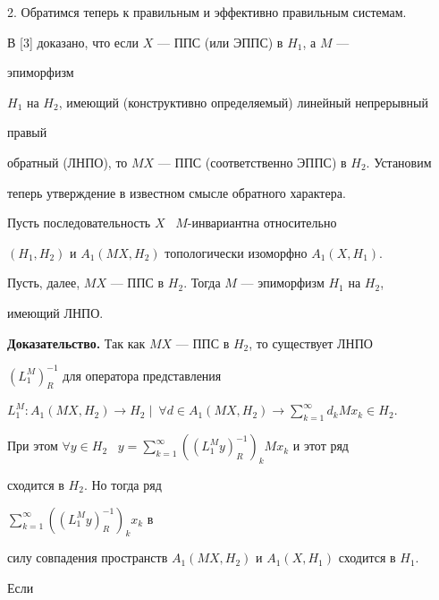 \medskip








2. Обратимся теперь к правильным и эффективно правильным системам.


В [3] доказано, что если $X$ --- ППС (или ЭППС) в $H_1$, а $M$ ---


эпиморфизм


$H_1$ на $H_2$, имеющий (конструктивно определяемый) линейный непрерывный


правый


обратный (ЛНПО), то $MX$ --- ППС (соответственно ЭППС) в $H_2$. Установим


теперь утверждение в известном смысле обратного характера.








\begin{prop}


Пусть последовательность $X$ \ $M$-инвариантна относительно


$(H_1,H_2)$ и $A_1(MX,H_2)$ топологически изоморфно $A_1(X,H_1)$.


Пусть, далее, $MX$ --- ППС в $H_2$. Тогда $M$ --- эпиморфизм $H_1$ на $H_2$,


имеющий ЛНПО.


\end{prop}








{\bf Доказательство.} Так как $MX$ --- ППС в $H_2$, то существует ЛНПО


$(L_1^M)_R^{-1}$ для оператора представления


$L_1^M:A_1(MX,H_2)\to H_2 \mid \ \forall d\in


A_1(MX,H_2)\longrightarrow


\sum\limits_{k=1}^{\infty}d_kMx_k\in H_2$.


При этом $\forall y\in


H_2$ \ $y=\sum\limits_{k=1}^{\infty}((L_1^M y)_R^{-1})_k Mx_k$ и этот ряд


сходится в $H_2$. Но тогда ряд


$\sum\limits_{k=1}^{\infty}((L_1^M y)_R^{-1})_k x_k$ в


силу совпадения пространств $A_1(MX,H_2)$ и $A_1(X,H_1)$ сходится в $H_1$.


Если


